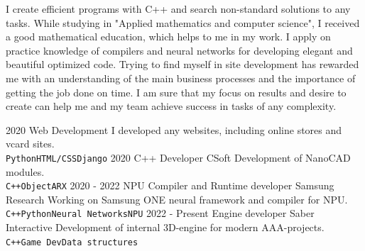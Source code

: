 \documentclass[9pt]{developercv} %
\begin{document}
\begin{minipage}[t]{0.55\textwidth} %
	\vspace{-\baselineskip} %
I create efficient programs with C++ and search non-standard solutions to any tasks. While studying in "Applied mathematics and computer science", I received a good mathematical education, which helps to me in my work. I apply on practice knowledge of compilers and neural networks for developing elegant and beautiful optimized code. Trying to find myself in site development has rewarded me with an understanding of the main business processes and the importance of getting the job done on time. I am sure that my focus on results and desire to create can help me and my team achieve success in tasks of any complexity. 

\end{minipage}
\hfill %
\begin{minipage}[t]{0.40\textwidth} %
	\vspace{-\baselineskip} %
	\begin{barchart}{5.5}
	\end{barchart}
	\begin{center}
    \end{center}
\end{minipage}

\vspace{0.05cm}


\begin{entrylist}
	\entry
		{2020}
		{Web Development}
		{}
		{I developed any websites, including online stores and vcard sites.\\
		\texttt{Python}\slashsep\texttt{HTML/CSS}\slashsep\texttt{Django}}
	\entry
		{2020}
		{C++ Developer}
		{CSoft}
		{Development of NanoCAD modules.  \\
		\texttt{C++}\slashsep\texttt{ObjectARX}}
	\entry
		{2020 - 2022}
		{NPU Compiler and Runtime developer}
		{Samsung Research}
		{Working on Samsung ONE neural framework and compiler for NPU.  \\
		\texttt{C++}\slashsep\texttt{Python}\slashsep\texttt{Neural Networks}\slashsep\texttt{NPU}}
	\entry
		{2022 - Present}
		{Engine developer}
		{Saber Interactive}
		{Development of internal 3D-engine for modern AAA-projects.  \\
		\texttt{C++}\slashsep\texttt{Game Dev}\slashsep\texttt{Data structures}}
		
\end{entrylist}
\end{document}
